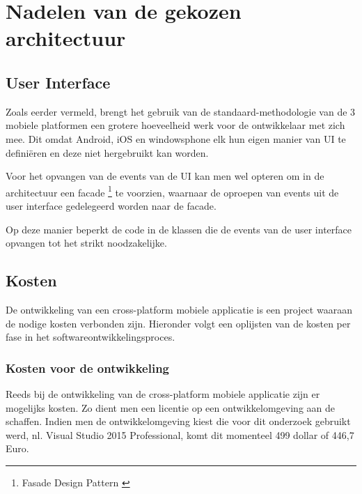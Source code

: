 \label{sec:nadelenvandegekozenapparchitectuur}
\section{Nadelen van de gekozen architectuur}
\subsection{User Interface}
Zoals eerder vermeld, brengt het gebruik van de standaard-methodologie van de 3 mobiele platformen een grotere hoeveelheid
werk voor de ontwikkelaar met zich mee. Dit omdat Android, iOS en windowsphone elk hun eigen manier van UI te definiëren en deze niet hergebruikt kan worden.

Voor het opvangen van de events van de UI kan men wel opteren om in de architectuur een facade \footnote{Fasade Design Pattern \cite{dofactorycom2017}} te voorzien, waarnaar de oproepen van events uit de user interface gedelegeerd worden naar de facade.

Op deze manier beperkt de code in de klassen die de events van de user interface opvangen tot het strikt noodzakelijke.
\label{sec:appkosten}
\subsection{Kosten}
De ontwikkeling van een cross-platform mobiele applicatie is een project waaraan de nodige kosten verbonden zijn.
Hieronder volgt een oplijsten van de kosten per fase in het softwareontwikkelingsproces.

\subsubsection{Kosten voor de ontwikkeling}
Reeds bij de ontwikkeling van de cross-platform mobiele applicatie zijn er mogelijks kosten. Zo dient men een licentie op een ontwikkelomgeving
aan de schaffen. Indien men de ontwikkelomgeving kiest die voor dit onderzoek gebruikt werd, nl. Visual Studio 2015 Professional,
komt dit momenteel 499 dollar of 446,7 Euro.

